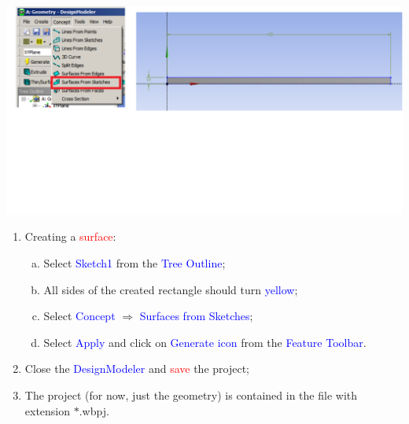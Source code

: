 \documentclass[10pt,compress]{beamer}
\newcommand{\red}{\textcolor{red}}
\newcommand{\blue}{\textcolor{blue}}
\begin{document}
\begin{frame}
\begin{columns}
\begin{column}[l]{0.5\linewidth}
{\begin{center}
                \includegraphics[width=\columnwidth, clip]{./Figs/Geometry4b.pdf} 
          \end{center}}
          \begin{enumerate}\scriptsize\setcounter{enumi}{6}
             \item<2-> Creating a \red{surface}:
                 \begin{enumerate}[a)]\scriptsize
                    \item<2-> Select \blue{Sketch1} from the \blue{Tree Outline};
                    \item<2-> All sides of the created rectangle should turn \blue{yellow};
                    \item<2-> Select \blue{Concept} $\Rightarrow$ \blue{Surfaces from Sketches};
                    \item<2-> Select \blue{Apply} and click on \blue{Generate icon} from the \blue{Feature Toolbar}.
                 \end{enumerate}
             \item<3-> Close the \blue{DesignModeler} and \red{save} the project;
             \item<3-> The project (for now, just the geometry) is contained in the file with extension $\ast$.wbpj.
          \end{enumerate}
       \end{column}
    \end{columns}
\end{frame} 
\end{document}
